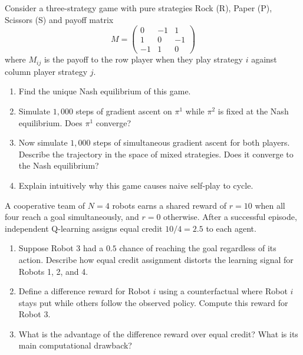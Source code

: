 \begin{exercise}
\label{ex:self-play-rps}
Consider a three-strategy game with pure strategies Rock (R), Paper
(P), Scissors (S) and payoff matrix
\[
M = \begin{pmatrix} 0 & -1 & 1 \\ 1 & 0 & -1 \\ -1 & 1 & 0
\end{pmatrix}
\]
where $M_{ij}$ is the payoff to the row player when they play
strategy $i$ against column player strategy $j$.
\begin{enumerate}[label=(\alph*)]
  \item Find the unique Nash equilibrium of this game.
  \item Simulate $1{,}000$ steps of gradient ascent on $\pi^1$ while
    $\pi^2$ is fixed at the Nash equilibrium. Does $\pi^1$ converge?
  \item Now simulate $1{,}000$ steps of simultaneous gradient ascent
    for both players. Describe the trajectory in the space of mixed
    strategies. Does it converge to the Nash equilibrium?
  \item Explain intuitively why this game causes naive self-play to
    cycle.
\end{enumerate}
\end{exercise}

\begin{exercise}
\label{ex:credit-assignment}
A cooperative team of $N = 4$ robots earns a shared reward of $r =
10$ when all four reach a goal simultaneously, and $r = 0$ otherwise.
After a successful episode, independent Q-learning assigns equal
credit $10/4 = 2.5$ to each agent.
\begin{enumerate}[label=(\alph*)]
  \item Suppose Robot 3 had a $0.5$ chance of reaching the goal
    regardless of its action. Describe how equal credit assignment
    distorts the learning signal for Robots 1, 2, and 4.
  \item Define a difference reward for Robot $i$ using a counterfactual
    where Robot $i$ stays put while others follow the observed policy.
    Compute this reward for Robot 3.
  \item What is the advantage of the difference reward over equal
    credit? What is its main computational drawback?
\end{enumerate}
\end{exercise}


